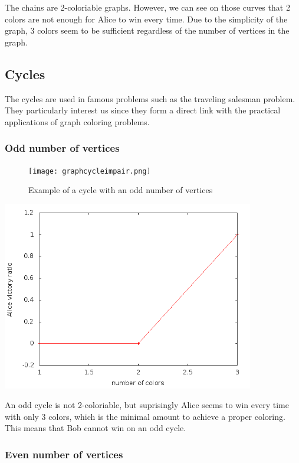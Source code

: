 The chains are 2-coloriable graphs. However, we can see on those curves that 2 colors are not enough for Alice to win every time. Due to the simplicity of the graph, 3 colors seem to be sufficient regardless of the number of vertices in the graph.

\subsection{Cycles}

The cycles are used in famous problems such as the traveling salesman problem. They particularly interest us since they form a direct link with the practical applications of graph coloring problems.

\subsubsection{Odd number of vertices}

\begin{figure}[h]
\begin{center}  
	\texttt{[image: graphcycleimpair.png]}
\end{center}
    \caption{Example of a cycle with an odd number of vertices}
    \label{cycleimpaire}
\end{figure}

\includegraphics[width=11cm]{resultats/cycleimpair.png}

An odd cycle is not 2-coloriable, but suprisingly Alice seems to win every time with only 3 colors, which is the minimal amount to achieve a proper coloring. This means that Bob cannot win on an odd cycle.

\subsubsection{Even number of vertices}

